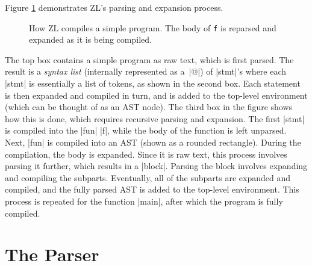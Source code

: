 Figure \ref{fig} demonstrates ZL's parsing and expansion process.  
\begin{figure}
\begin{center}
\UndefineShortVerb{\|}
\thefig
\DefineShortVerb{\|}
\end{center}
\caption{How ZL compiles a simple program.  The body of \texttt{f} is
  reparsed and expanded as it is being compiled.}
\label{fig}
\end{figure}
The top box contains a simple program as raw text, which is first parsed.
The result is a \textit{syntax list} (internally represented as a~|@|)
of |stmt|'s where each |stmt| is essentially a list of tokens, as
shown in the second box.  Each statement is then expanded and compiled
in turn, and is added to the top-level environment (which can be
thought of as an AST node). The third box in the figure shows how this
is done, which requires recursive parsing and expansion.  The first
|stmt| is compiled into the |fun| |f|, while the body of the function
is left unparsed.  Next, |fun| is compiled into an AST (shown as a
rounded rectangle).  During the compilation, the body is expanded.
Since it is raw text, this process involves parsing it further, which
results in a |block|.  Parsing the block involves expanding and
compiling the subparts.  Eventually, all of the subparts are
expanded and compiled, and the fully parsed AST is added to the
top-level environment.  This process is repeated for the function
|main|, after which the program is fully compiled.
\section{The Parser}
\label{parser}

